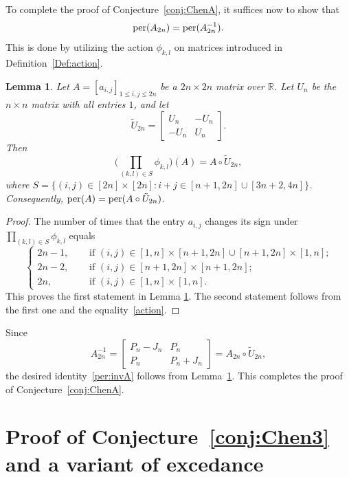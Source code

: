\documentclass[11pt,reqno]{amsart}
\numberwithin{equation}{section}
\theoremstyle{plain}
\newtheorem{lemma}[theorem]{Lemma}
\theoremstyle{definition}
\def\per{\mathrm{per}}
\def\per{{\rm per}}
\begin{document}
To complete the proof of Conjecture~\ref{conj:ChenA}, it suffices now to show that
\begin{equation}\label{per:invA}
\per(A_{2n})=\per(A^{-1}_{2n}).
\end{equation}
This is done by utilizing the  action $\phi_{k,l}$ on matrices  introduced in Definition~\ref{Def:action}.

\begin{lemma}\label{H:sign2}
Let $A=[a_{i,j}]_{1\leq i,j\leq 2n}$ be a $2n\times 2n$ matrix over  $\mathbb{R}$. Let $U_n$ be the $n\times n$ matrix with all entries $1$, and let
$$
\tilde U_{2n}=\begin{bmatrix}
U_n &-U_n\\
-U_n & U_n
\end{bmatrix}.
$$  Then
$$
\biggl(\prod_{(k,l)\in S}\phi_{k,l}\biggr)(A)=A\circ \tilde U_{2n},
$$
where $S=\{(i,j)\in[2n]\times[2n]: i+j\in[n+1,2n]\cup[3n+2,4n] \}$. Consequently, $\per(A)=\per(A\circ \tilde U_{2n})$.
\end{lemma}
\begin{proof}
The number of times that the entry $a_{i,j}$ changes its sign under $\prod\limits_{(k,l)\in S}\phi_{k,l}$ equals
$$
\begin{cases}
2n-1, &\quad\text{ if $(i,j)\in[1,n]\times[n+1,2n]\cup[n+1,2n]\times[1,n]$;}\\
2n-2, &\quad\text{ if $(i,j)\in[n+1,2n]\times[n+1,2n]$;}\\
2n, &\quad\text{ if $(i,j)\in[1,n]\times[1,n]$}.
\end{cases}
$$
This proves the first statement in Lemma \ref{H:sign2}.
The second statement follows from the first one and the equality~\eqref{action}.
\end{proof}

Since
$$
A^{-1}_{2n}=\begin{bmatrix}
P_n-J_n & P_n \\
P_n & P_n+J_n
\end{bmatrix}=A_{2n}\circ \tilde U_{2n},
$$
the desired identity~\eqref{per:invA} follows from Lemma~\ref{H:sign2}. This completes the proof of Conjecture~\ref{conj:ChenA}.

\section{Proof of Conjecture~\ref{conj:Chen3} and a variant of excedance}\label{sec:conj of chen2}
\end{document}
